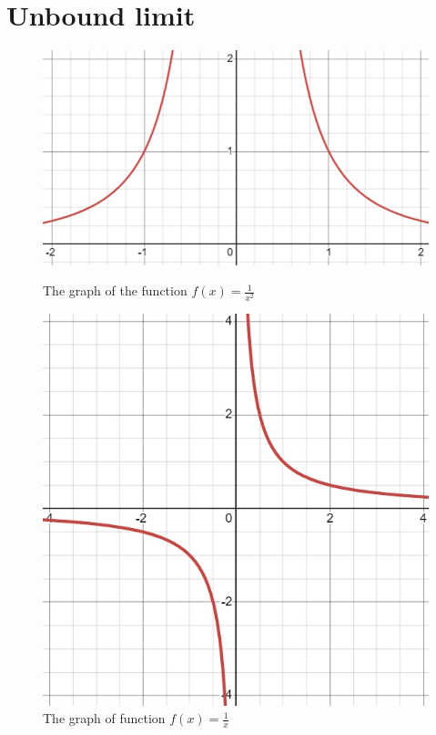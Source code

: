 \section{Unbound limit}
\begin{figure}
    \centering
    \begin{minipage}{.5\textwidth}
        \centering
        \includegraphics[width=0.9\linewidth]{math/1.png}
        \caption{The graph of the function $f(x)=\frac{1}{x^2}$}
        \label{fig:m1}
    \end{minipage}%
    \begin{minipage}{.5\textwidth}
        \centering
        \includegraphics[width=0.9\linewidth]{math/4.png}
        \caption{The graph of function $f(x)=\frac{1}{x}$}
        \label{fig:m4}
    \end{minipage}
\end{figure}

